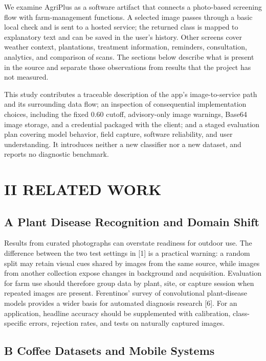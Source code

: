 \documentclass[conference]{IEEEtran}
\begin{document}
We examine AgriPlus as a software artifact that connects a photo-based screening flow with farm-management functions. A selected image passes through a basic local check and is sent to a hosted service; the returned class is mapped to explanatory text and can be saved in the user's history. Other screens cover weather context, plantations, treatment information, reminders, consultation, analytics, and comparison of scans. The sections below describe what is present in the source and separate those observations from results that the project has not measured.

This study contributes a traceable description of the app's image-to-service path and its surrounding data flow; an inspection of consequential implementation choices, including the fixed 0.60 cutoff, advisory-only image warnings, Base64 image storage, and a credential packaged with the client; and a staged evaluation plan covering model behavior, field capture, software reliability, and user understanding. It introduces neither a new classifier nor a new dataset, and reports no diagnostic benchmark.

\section*{II RELATED WORK}

\subsection*{A Plant Disease Recognition and Domain Shift}

Results from curated photographs can overstate readiness for outdoor use. The difference between the two test settings in [1] is a practical warning: a random split may retain visual cues shared by images from the same source, while images from another collection expose changes in background and acquisition. Evaluation for farm use should therefore group data by plant, site, or capture session when repeated images are present. Ferentinos' survey of convolutional plant-disease models provides a wider basis for automated diagnosis research [6]. For an application, headline accuracy should be supplemented with calibration, class-specific errors, rejection rates, and tests on naturally captured images.

\subsection*{B Coffee Datasets and Mobile Systems}
\end{document}
